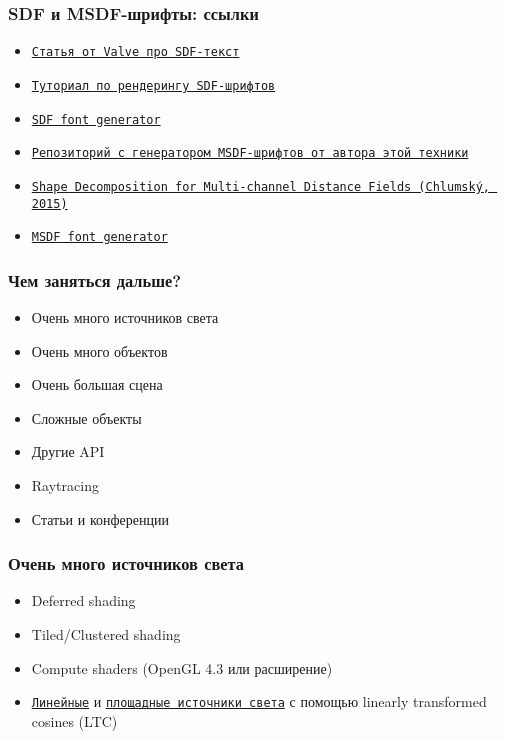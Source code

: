 \documentclass{beamer}
\begin{document}
\begin{frame}[fragile]
\frametitle{SDF и MSDF-шрифты: ссылки}
\begin{itemize}
\item \href{https://steamcdn-a.akamaihd.net/apps/valve/2007/SIGGRAPH2007_AlphaTestedMagnification.pdf}{\texttt{Статья от Valve про SDF-текст}}
\item \href{https://blog.mapbox.com/drawing-text-with-signed-distance-fields-in-mapbox-gl-b0933af6f817}{\texttt{Туториал по рендерингу SDF-шрифтов}}
\item \href{https://evanw.github.io/font-texture-generator/}{\texttt{SDF font generator}}
\item \href{https://github.com/Chlumsky/msdfgen}{\texttt{Репозиторий с генератором MSDF-шрифтов от автора этой техники}}
\item \href{https://github.com/Chlumsky/msdfgen/files/3050967/thesis.pdf}{\texttt{Shape Decomposition for Multi-channel Distance Fields (Chlumský, 2015)}}
\item \href{https://msdf-bmfont.donmccurdy.com/}{\texttt{MSDF font generator}}
\end{itemize}
\end{frame}

\begin{frame}[fragile]
\frametitle{Чем заняться дальше?}
\begin{itemize}
\item Очень много источников света
\item Очень много объектов
\item Очень большая сцена
\item Сложные объекты
\item Другие API
\item Raytracing
\item Статьи и конференции
\end{itemize}
\end{frame}

\begin{frame}[fragile]
\frametitle{Очень много источников света}
\begin{itemize}
\item Deferred shading
\item Tiled/Clustered shading
\item Compute shaders (OpenGL 4.3 или расширение)
\item \href{https://hal.science/hal-02155101v1/file/LTC_linearlights_GPUZen.pdf}{\texttt{Линейные}} и \href{https://learnopengl.com/Guest-Articles/2022/Area-Lights}{\texttt{площадные источники света}} с помощью linearly transformed cosines (LTC)
\end{itemize}
\end{frame}
\end{document}
